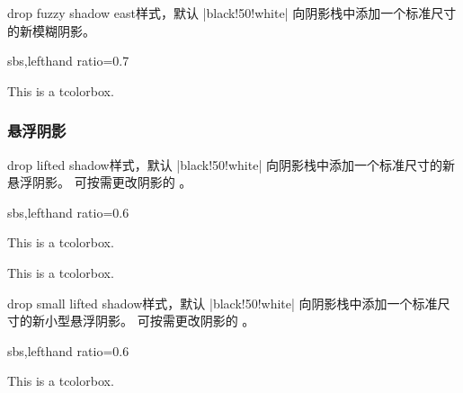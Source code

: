 \begin{docTcbKey}{drop fuzzy shadow east}{}{样式，默认 |black!50!white|}
  向阴影栈中添加一个标准尺寸的新模糊阴影。
\begin{dispExample*}{sbs,lefthand ratio=0.7}
\begin{tcolorbox}[drop fuzzy shadow east,
  enhanced,colback=red!5!white,colframe=red!75!black]
  This is a tcolorbox.
\end{tcolorbox}
\end{dispExample*}
\end{docTcbKey}%


\clearpage
\subsubsection{悬浮阴影}

\begin{docTcbKey}{drop lifted shadow}{}{样式，默认 |black!50!white|}
  向阴影栈中添加一个标准尺寸的新悬浮阴影。
  可按需更改阴影的 。
\begin{dispExample*}{sbs,lefthand ratio=0.6}

\begin{tcolorbox}
This is a tcolorbox.
\end{tcolorbox}\par\bigskip
\begin{tcolorbox}[title=Another shadow,
  drop lifted shadow=blue]
This is a tcolorbox.
\end{tcolorbox}
\end{dispExample*}
\end{docTcbKey}


\begin{docTcbKey}{drop small lifted shadow}{}{样式，默认 |black!50!white|}
  向阴影栈中添加一个标准尺寸的新小型悬浮阴影。
  可按需更改阴影的 。
\begin{dispExample*}{sbs,lefthand ratio=0.6}

\par\bigskip
\begin{tcolorbox}[title=Another shadow,
  drop small lifted shadow=black]
This is a tcolorbox.
\end{tcolorbox}
\end{dispExample*}
\end{docTcbKey}


